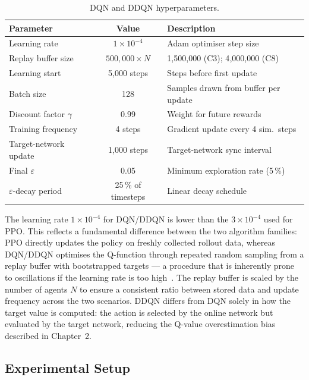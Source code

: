 \begin{table}[htbp]
    \caption{DQN and DDQN hyperparameters.}
    \label{tab:dqn_hyper}
    \centering
    \begin{tabular}{lcp{5.5cm}}
        \toprule
        \textbf{Parameter} & \textbf{Value} & \textbf{Description} \\
        \midrule
        Learning rate      & $1\times10^{-4}$ & Adam optimiser step size \\
        Replay buffer size & $500{,}000\times N$
            & 1{,}500{,}000 (C3); 4{,}000{,}000 (C8) \\
        Learning start     & 5{,}000 steps & Steps before first update \\
        Batch size         & 128  & Samples drawn from buffer per update \\
        Discount factor $\gamma$ & 0.99 & Weight for future rewards \\
        Training frequency & 4 steps & Gradient update every 4 sim.\ steps \\
        Target-network update & 1{,}000 steps & Target-network sync interval \\
        Final $\varepsilon$ & 0.05 & Minimum exploration rate (5\,\%) \\
        $\varepsilon$-decay period & 25\,\% of timesteps
            & Linear decay schedule \\
        \bottomrule
    \end{tabular}
\end{table}

The learning rate $1\times10^{-4}$ for DQN/DDQN is lower than the
$3\times10^{-4}$ used for PPO. This reflects a fundamental difference between
the two algorithm families: PPO directly updates the policy on freshly
collected rollout data, whereas DQN/DDQN optimises the Q-function through
repeated random sampling from a replay buffer with bootstrapped targets — a
procedure that is inherently prone to oscillations if the learning rate is too
high~\cite{mnih2015dqn}. The replay buffer is scaled by the number of agents $N$
to ensure a consistent ratio between stored data and update frequency across
the two scenarios. DDQN differs from DQN solely in how the target value is
computed: the action is selected by the online network but evaluated by the
target network, reducing the Q-value overestimation bias described in
Chapter~2.

\subsection{Experimental Setup}

